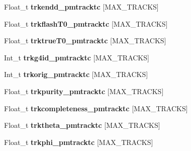 \begin{DoxyCompactItemize}
\item 
\hypertarget{classanatree_a15b080e24776c82776cc0e166872b67c}{Float\-\_\-t {\bfseries trkendd\-\_\-pmtracktc} \mbox{[}M\-A\-X\-\_\-\-T\-R\-A\-C\-K\-S\mbox{]}}\label{classanatree_a15b080e24776c82776cc0e166872b67c}

\item 
\hypertarget{classanatree_a7af1237cd50841288249923a4abc49fa}{Float\-\_\-t {\bfseries trkflash\-T0\-\_\-pmtracktc} \mbox{[}M\-A\-X\-\_\-\-T\-R\-A\-C\-K\-S\mbox{]}}\label{classanatree_a7af1237cd50841288249923a4abc49fa}

\item 
\hypertarget{classanatree_a0d8055f03c13fc09fdd485c0e5cdc776}{Float\-\_\-t {\bfseries trktrue\-T0\-\_\-pmtracktc} \mbox{[}M\-A\-X\-\_\-\-T\-R\-A\-C\-K\-S\mbox{]}}\label{classanatree_a0d8055f03c13fc09fdd485c0e5cdc776}

\item 
\hypertarget{classanatree_a45ee3f10137fb84a4c65c589e5203d4a}{Int\-\_\-t {\bfseries trkg4id\-\_\-pmtracktc} \mbox{[}M\-A\-X\-\_\-\-T\-R\-A\-C\-K\-S\mbox{]}}\label{classanatree_a45ee3f10137fb84a4c65c589e5203d4a}

\item 
\hypertarget{classanatree_a159bba3972eda8524df8db1fe95a7940}{Int\-\_\-t {\bfseries trkorig\-\_\-pmtracktc} \mbox{[}M\-A\-X\-\_\-\-T\-R\-A\-C\-K\-S\mbox{]}}\label{classanatree_a159bba3972eda8524df8db1fe95a7940}

\item 
\hypertarget{classanatree_a153f631b584b3b365349b970e5851bc8}{Float\-\_\-t {\bfseries trkpurity\-\_\-pmtracktc} \mbox{[}M\-A\-X\-\_\-\-T\-R\-A\-C\-K\-S\mbox{]}}\label{classanatree_a153f631b584b3b365349b970e5851bc8}

\item 
\hypertarget{classanatree_a824acc5847e9cc75ff10cf27b9f29d0d}{Float\-\_\-t {\bfseries trkcompleteness\-\_\-pmtracktc} \mbox{[}M\-A\-X\-\_\-\-T\-R\-A\-C\-K\-S\mbox{]}}\label{classanatree_a824acc5847e9cc75ff10cf27b9f29d0d}

\item 
\hypertarget{classanatree_ae37bd05d4845c918a19b092f6f3b0e77}{Float\-\_\-t {\bfseries trktheta\-\_\-pmtracktc} \mbox{[}M\-A\-X\-\_\-\-T\-R\-A\-C\-K\-S\mbox{]}}\label{classanatree_ae37bd05d4845c918a19b092f6f3b0e77}

\item 
\hypertarget{classanatree_a99ac97914c8806704d7f80ae01d003a1}{Float\-\_\-t {\bfseries trkphi\-\_\-pmtracktc} \mbox{[}M\-A\-X\-\_\-\-T\-R\-A\-C\-K\-S\mbox{]}}\label{classanatree_a99ac97914c8806704d7f80ae01d003a1}


\end{DoxyCompactItemize}
